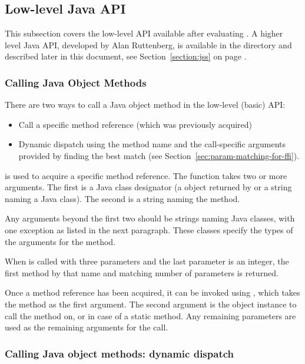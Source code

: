\documentclass[10pt]{book}
\begin{document}
\subsection{Low-level Java API}

This subsection covers the low-level API available after evaluating
.  A higher level Java API, developed by Alan
Ruttenberg, is available in the  directory and described
later in this document, see Section~\ref{section:jss} on page
\pageref{section:jss}.

\subsubsection{Calling Java Object Methods}

There are two ways to call a Java object method in the low-level (basic) API:

\begin{itemize}
\item Call a specific method reference (which was previously acquired)
\item Dynamic dispatch using the method name and the call-specific
  arguments provided by finding the best match (see
  Section~\ref{sec:param-matching-for-ffi}).
\end{itemize}

 is used to acquire a specific method reference.  The
function takes two or more arguments. The first is a Java class
designator (a  object returned by
 or a string naming a Java class). The second is a
string naming the method.

Any arguments beyond the first two should be strings naming Java
classes, with one exception as listed in the next paragraph. These
classes specify the types of the arguments for the method.

When  is called with three parameters and the last
parameter is an integer, the first method by that name and matching
number of parameters is returned.

Once a method reference has been acquired, it can be invoked using
, which takes the method as the first argument. The
second argument is the object instance to call the method on, or
 in case of a static method.  Any remaining parameters are
used as the remaining arguments for the call.

\subsubsection{Calling Java object methods: dynamic dispatch}
\end{document}
